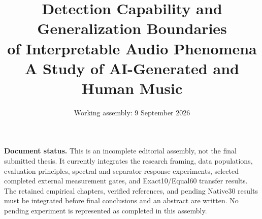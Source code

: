 \documentclass[11pt,a4paper]{article}
\title{Detection Capability and Generalization Boundaries\\
of Interpretable Audio Phenomena\\
\large A Study of AI-Generated and Human Music}
\author{}
\date{Working assembly: 9 September 2026}
\begin{document}
\maketitle
\noindent\textbf{Document status.}
This is an incomplete editorial assembly, not the final submitted thesis.
It currently integrates the research framing, data populations, evaluation principles,
spectral and separator-response experiments, selected completed external
measurement gates, and Exact10/Equal60 transfer results.
The retained empirical chapters, verified references, and pending Native30
results must be integrated before final conclusions and an abstract are written.
No pending experiment is represented as completed in this assembly.
\tableofcontents
\clearpage













\end{document}

